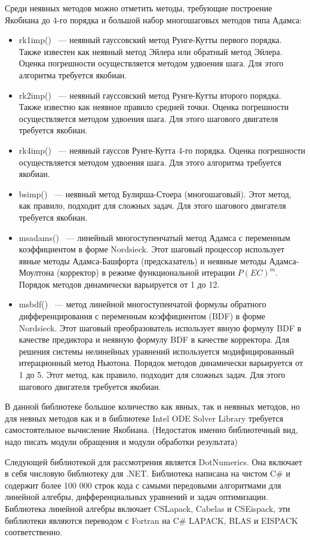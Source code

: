 Среди неявных методов можно отметить методы, требующие построение Якобиана до 4-го порядка и большой набор многошаговых методов типа
Адамса:
\begin{itemize}
    \item rk1imp() ~--- неявный гауссовский метод Рунге-Кутты первого порядка. Также известен как неявный метод Эйлера или обратный
        метод Эйлера. Оценка погрешности осуществляется методом удвоения шага. Для этого алгоритма требуется якобиан.
    \item rk2imp() ~--- неявный гауссовский метод Рунге-Кутты второго порядка. Также известно как неявное правило средней точки. Оценка
        погрешности осуществляется методом удвоения шага. Для этого шагового двигателя требуется якобиан.
    \item rk4imp() ~--- неявный гауссов Рунге-Кутта 4-го порядка. Оценка погрешности осуществляется методом удвоения шага. Для этого
        алгоритма требуется якобиан.
    \item bsimp() ~--- неявный метод Булирша-Стоера (многошаговый). Этот метод, как правило, подходит для сложных задач. Для этого
        шагового двигателя требуется якобиан.
    \item msadams() ~--- линейный многоступенчатый метод Адамса с переменным коэффициентом в форме Nordsieck. Этот шаговый процессор
        использует явные методы Адамса-Башфорта (предсказатель) и неявные методы Адамса-Моултона (корректор) в режиме функциональной
        итерации $P(EC)^m$. Порядок методов динамически варьируется от 1 до 12.
    \item msbdf() ~--- метод линейной многоступенчатой формулы обратного дифференцирования с переменным коэффициентом (BDF) в форме
        Nordsieck. Этот шаговый преобразователь использует явную формулу BDF в качестве предиктора и неявную формулу BDF в качестве
        корректора. Для решения системы нелинейных уравнений используется модифицированный итерационный метод Ньютона. Порядок методов
        динамически варьируется от 1 до 5. Этот метод, как правило, подходит для сложных задач. Для этого шагового двигателя требуется
        якобиан.
\end{itemize}

В данной библиотеке большое количество как явных, так и неявных методов, но для невных методов как и в библиотеке Intel ODE Solver
Library требуется самостоятельное вычисление Якобиана. (Недостаток именно библиотечный вид, надо писать модули обращения и модули
обработки результата)

Следующей библиотекой для рассмотрения является DotNumerics. Она включает в себя числовую библиотеку для .NET. Библиотека написана на
чистом C\# и содержит более 100 000 строк кода с
самыми передовыми алгоритмами для линейной алгебры, дифференциальных уравнений и задач оптимизации. Библиотека линейной алгебры
включает CSLapack, Cabelas и CSEispack, эти библиотеки являются переводом с Fortran на C\# LAPACK, BLAS и EISPACK соответственно.

